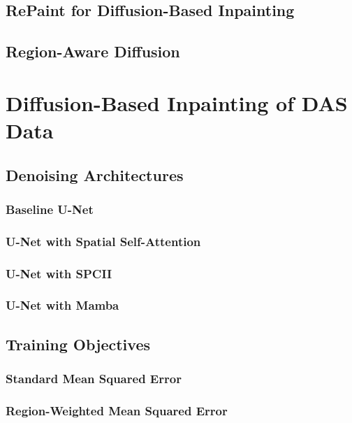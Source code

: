\documentclass[english,ba]{tudo-sse-thesis}
\begin{document}
\section{RePaint for Diffusion-Based Inpainting}

\section{Region-Aware Diffusion}


\chapter{Diffusion-Based Inpainting of DAS Data}

\section{Denoising Architectures}

\subsection{Baseline U-Net}

\subsection{U-Net with Spatial Self-Attention}

\subsection{U-Net with SPCII}

\subsection{U-Net with Mamba}

\section{Training Objectives}

\subsection{Standard Mean Squared Error}

\subsection{Region-Weighted Mean Squared Error}
\end{document}
